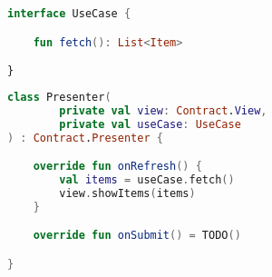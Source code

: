 \documentclass[10pt]{beamer}
\begin{document}
\begin{frame}[fragile]
\begin{lstlisting}[language=Kotlin, basicstyle=\ttfamily]
\end{lstlisting}
\end{frame}

\begin{frame}[fragile]
\begin{lstlisting}[language=Kotlin, basicstyle=\ttfamily]
\end{lstlisting}
\end{frame}

\begin{frame}[fragile]
\begin{lstlisting}[language=Kotlin, basicstyle=\ttfamily]
\end{lstlisting}
\end{frame}















\begin{frame}[fragile]
\begin{lstlisting}[language=Kotlin, basicstyle=\ttfamily]
interface UseCase {

    fun fetch(): List<Item>

}
\end{lstlisting}
\end{frame}



\begin{frame}[fragile]
\begin{lstlisting}[language=Kotlin, basicstyle=\ttfamily]
class Presenter(
        private val view: Contract.View,
        private val useCase: UseCase
) : Contract.Presenter {

    override fun onRefresh() {
        val items = useCase.fetch()
        view.showItems(items)
    }

    override fun onSubmit() = TODO()

}
\end{lstlisting}
\end{frame}



\begin{frame}[fragile]
\begin{lstlisting}[language=Kotlin, basicstyle=\ttfamily]
\end{lstlisting}
\end{frame}
\end{document}
